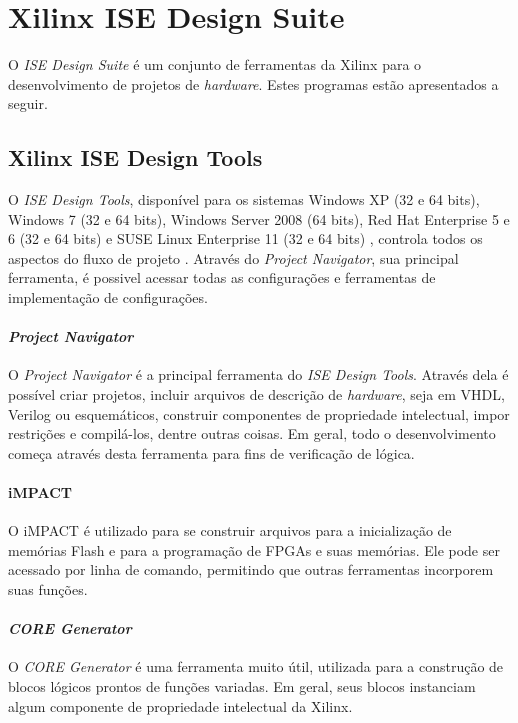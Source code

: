 \documentclass[11pt,a4paper,oneside]{book}
\begin{document}
\section{Xilinx ISE Design Suite}
O \textit{ISE Design Suite} é um conjunto de ferramentas da Xilinx para o desenvolvimento de projetos de \textit{hardware}.
Estes programas estão apresentados a seguir.

\subsection{Xilinx ISE Design Tools}
O \textit{ISE Design Tools}, disponível para os sistemas Windows XP (32 e 64 bits), Windows 7 (32 e 64 bits), Windows Server 2008 (64 bits), Red Hat Enterprise 5 e 6 (32 e 64 bits) e SUSE Linux Enterprise 11 (32 e 64 bits) \cite{ug631}, controla todos os aspectos do fluxo de projeto \cite{ug695}.
Através do \textit{Project Navigator}, sua principal ferramenta, é possivel acessar todas as configurações e ferramentas de implementação de configurações.

\paragraph{\textit{Project Navigator}} O \textit{Project Navigator} é a principal ferramenta do \textit{ISE Design Tools}.
Através dela é possível criar projetos, incluir arquivos de descrição de \textit{hardware}, seja em VHDL, Verilog ou esquemáticos, construir componentes de propriedade intelectual, impor restrições e compilá-los, dentre outras coisas.
Em geral, todo o desenvolvimento começa através desta ferramenta para fins de verificação de lógica.

\paragraph{iMPACT}
O iMPACT é utilizado para se construir arquivos para a inicialização de memórias Flash e para a programação de FPGAs e suas memórias.
Ele pode ser acessado por linha de comando, permitindo que outras ferramentas incorporem suas funções.

\paragraph{\textit{CORE Generator}}
O \textit{CORE Generator} é uma ferramenta muito útil, utilizada para a construção de blocos lógicos prontos de funções variadas.
Em geral, seus blocos instanciam algum componente de propriedade intelectual da Xilinx.
\end{document}
